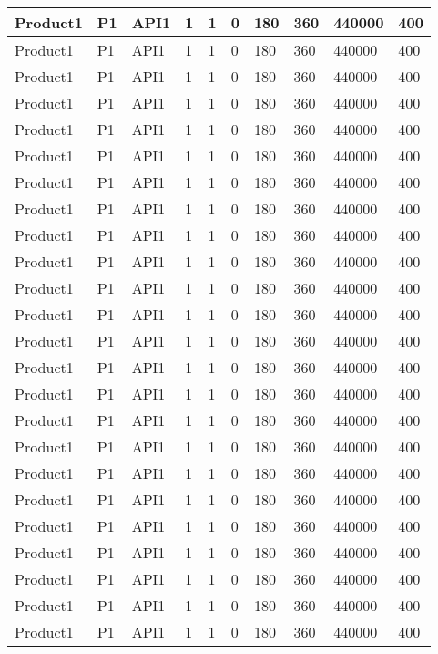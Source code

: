 \documentclass{article}
\begin{document}
\begin{longtable}[l]{|p{1.5cm}|p{1.7cm}|p{1cm}|p{1.5cm}|p{1.7cm}|p{1cm}|p{1cm}|p{1cm}|p{1cm}|p{1.5cm}|}
\hline
Product1 & P1 & API1 & 1 & 1 & 0 & 180 & 360 & 440000 & 400\\
\hline
Product1 & P1 & API1 & 1 & 1 & 0 & 180 & 360 & 440000 & 400\\
\hline
Product1 & P1 & API1 & 1 & 1 & 0 & 180 & 360 & 440000 & 400\\
\hline
Product1 & P1 & API1 & 1 & 1 & 0 & 180 & 360 & 440000 & 400\\
\hline
Product1 & P1 & API1 & 1 & 1 & 0 & 180 & 360 & 440000 & 400\\
\hline
Product1 & P1 & API1 & 1 & 1 & 0 & 180 & 360 & 440000 & 400\\
\hline
Product1 & P1 & API1 & 1 & 1 & 0 & 180 & 360 & 440000 & 400\\
\hline
Product1 & P1 & API1 & 1 & 1 & 0 & 180 & 360 & 440000 & 400\\
\hline
Product1 & P1 & API1 & 1 & 1 & 0 & 180 & 360 & 440000 & 400\\
\hline
Product1 & P1 & API1 & 1 & 1 & 0 & 180 & 360 & 440000 & 400\\
\hline
Product1 & P1 & API1 & 1 & 1 & 0 & 180 & 360 & 440000 & 400\\
\hline
Product1 & P1 & API1 & 1 & 1 & 0 & 180 & 360 & 440000 & 400\\
\hline
Product1 & P1 & API1 & 1 & 1 & 0 & 180 & 360 & 440000 & 400\\
\hline
Product1 & P1 & API1 & 1 & 1 & 0 & 180 & 360 & 440000 & 400\\
\hline
Product1 & P1 & API1 & 1 & 1 & 0 & 180 & 360 & 440000 & 400\\
\hline
Product1 & P1 & API1 & 1 & 1 & 0 & 180 & 360 & 440000 & 400\\
\hline
Product1 & P1 & API1 & 1 & 1 & 0 & 180 & 360 & 440000 & 400\\
\hline
Product1 & P1 & API1 & 1 & 1 & 0 & 180 & 360 & 440000 & 400\\
\hline
Product1 & P1 & API1 & 1 & 1 & 0 & 180 & 360 & 440000 & 400\\
\hline
Product1 & P1 & API1 & 1 & 1 & 0 & 180 & 360 & 440000 & 400\\
\hline
Product1 & P1 & API1 & 1 & 1 & 0 & 180 & 360 & 440000 & 400\\
\hline
Product1 & P1 & API1 & 1 & 1 & 0 & 180 & 360 & 440000 & 400\\
\hline
Product1 & P1 & API1 & 1 & 1 & 0 & 180 & 360 & 440000 & 400\\
\hline
Product1 & P1 & API1 & 1 & 1 & 0 & 180 & 360 & 440000 & 400\\

\end{longtable}
\end{document}
